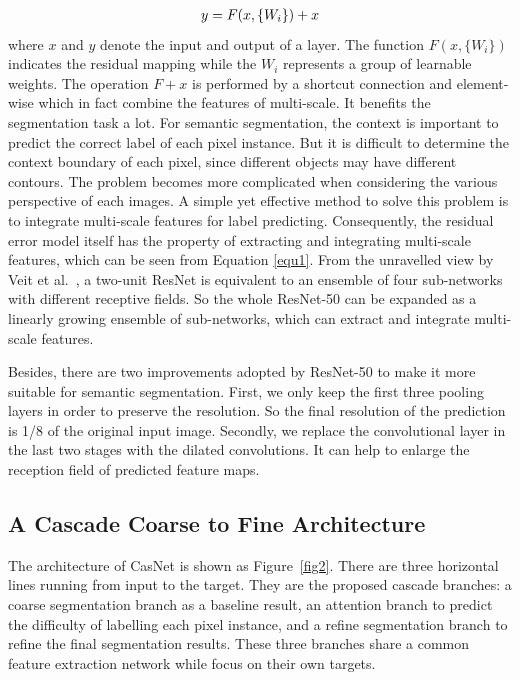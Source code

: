 \documentclass[10.5pt,compsoc]{TsT}
\newcommand{\upcite}[1]{\superscript{\textsuperscript{\cite{#1}}}}
\theoremstyle{mystyle}
\newcommand{\upcite}[1]{\textsuperscript{\cite{#1}}}
\begin{document}
{\begin{equation}\label{equ1}
\setlength\abovedisplayskip{4pt}
\setlength\belowdisplayskip{4pt}
\begin{split}
y = F(x, \{W_{i}\}) + x \\
\end{split}
\end{equation} 
where $x$ and $y$ denote the input and output of a layer. The function $F(x, \{W_{i}\})$ indicates the residual mapping while the $W_{i}$ represents a group of learnable weights. The operation $F + x$ is performed by a shortcut connection and element-wise which in fact combine the features of multi-scale. It benefits the segmentation task a lot. For semantic segmentation,  the context is important to predict the correct label of each pixel instance. But it is difficult to determine the context boundary of each pixel, since different objects may have different contours. The problem becomes more complicated when considering the various perspective of each images. A simple yet effective method to solve this problem is to integrate multi-scale features for label predicting. Consequently, the residual error model itself has the property of extracting and integrating multi-scale features, which can be seen from Equation \ref {equ1}. From the unravelled view by Veit et al.~\upcite{22}, a two-unit ResNet is equivalent to an ensemble of four sub-networks with different receptive fields. So the whole ResNet-50 can be expanded as a linearly growing ensemble of sub-networks, which can extract and integrate multi-scale features.

Besides, there are two improvements adopted by ResNet-50 to make it more suitable for semantic segmentation. First, we only keep the first three pooling layers in order to preserve the resolution. So the final resolution of the prediction is 1/8 of the original input image. Secondly, we replace the convolutional layer in the last two stages with the dilated convolutions. It can help to enlarge the reception field of predicted feature maps.



\subsection{A Cascade Coarse to Fine Architecture}
\label{s:casnet}
\noindent

The architecture of CasNet is shown as Figure~\ref{fig2}. There are three horizontal lines running from input to the target. They are the proposed cascade branches: a coarse segmentation branch as a baseline result, an attention branch to predict the difficulty of labelling each pixel instance, and a refine segmentation branch to refine the final segmentation results. 
These three branches share a common feature extraction network while focus on their own targets.

}
\end{document}

